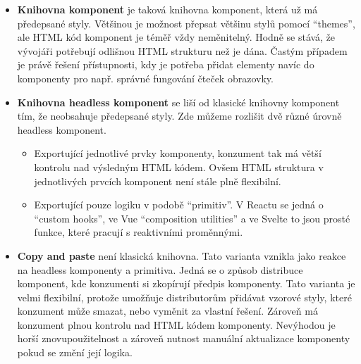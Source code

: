 \begin{itemize}
    \item \textbf{Knihovna komponent} je taková knihovna komponent, která už má předepsané styly. Většinou je možnost přepsat většinu stylů pomocí ``themes'', ale HTML kód komponent je téměř vždy neměnitelný.
          Hodně se stává, že vývojáři potřebují odlišnou HTML strukturu než je dána.
          Častým případem je právě řešení přístupnosti, kdy je potřeba přidat elementy navíc do komponenty pro např. správné fungování čteček obrazovky.
    \item \textbf{Knihovna headless komponent} se liší od klasické knihovny komponent tím, že neobsahuje předepsané styly.
          Zde můžeme rozlišit dvě různé úrovně headless komponent.
          \begin{itemize}
              \item Exportující jednotlivé prvky komponenty, konzument tak má větší kontrolu nad výsledným HTML kódem.
                    Ovšem HTML struktura v jednotlivých prvcích komponent není stále plně flexibilní.
              \item Exportující pouze logiku v podobě ``primitiv''. V Reactu se jedná o ``custom hooks'', ve Vue ``composition utilities'' a ve Svelte to jsou prosté funkce, které pracují s reaktivními proměnnými.
          \end{itemize}
    \item \textbf{Copy and paste} není klasická knihovna.
          Tato varianta vznikla jako reakce na headless komponenty a primitiva.
          Jedná se o způsob distribuce komponent, kde konzumenti si zkopírují předpis komponenty.
          Tato varianta je velmi flexibilní, protože umožňuje distributorům přidávat vzorové styly, které konzument může smazat, nebo vyměnit za vlastní řešení.
          Zároveň má konzument plnou kontrolu nad HTML kódem komponenty.
          Nevýhodou je horší znovupoužitelnost a zároveň nutnost manuální aktualizace komponenty pokud se změní její logika.
\end{itemize}


